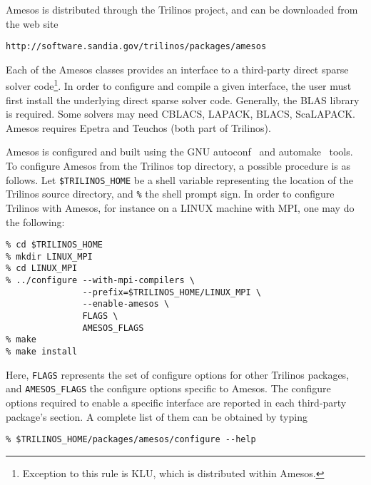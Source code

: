 \documentclass[11pt]{SANDreport}
\begin{document}
Amesos is distributed through the Trilinos project, and can be
downloaded from the web site
\begin{verbatim}
http://software.sandia.gov/trilinos/packages/amesos
\end{verbatim}

\smallskip

Each of the Amesos classes provides an interface to a third-party direct
sparse solver code\footnote{Exception to this rule is KLU, which is
  distributed within Amesos.}. In order to configure and compile a given
interface, the user must first install the underlying direct sparse
solver code. Generally, the BLAS library is required. Some solvers may
need CBLACS, LAPACK, BLACS, ScaLAPACK. Amesos requires Epetra and
Teuchos (both part of Trilinos).

Amesos is configured and built using the GNU autoconf~\cite{Autoconf}
and automake~\cite{Automake} tools. To configure Amesos from the
Trilinos top directory, a possible procedure is as follows.  Let
\verb!$TRILINOS_HOME! be a shell variable representing the location
of the Trilinos source directory, and \verb!%! the shell prompt sign.  In order to configure Trilinos with
Amesos, for instance on a LINUX machine with MPI, one may do the
following:
\begin{verbatim}
% cd $TRILINOS_HOME
% mkdir LINUX_MPI
% cd LINUX_MPI
% ../configure --with-mpi-compilers \
               --prefix=$TRILINOS_HOME/LINUX_MPI \
               --enable-amesos \
               FLAGS \
               AMESOS_FLAGS
% make
% make install
\end{verbatim}
Here, \verb!FLAGS! represents the set of configure options for other
Trilinos packages, and \verb!AMESOS_FLAGS! the configure options
specific to Amesos.  The configure options required to enable a specific
interface are reported in each third-party package's section. A complete
list of them can be obtained by typing
\begin{verbatim}
% $TRILINOS_HOME/packages/amesos/configure --help
\end{verbatim}
\end{document}
